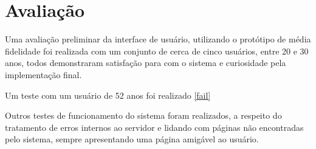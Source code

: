 \section{Avaliação}

Uma avaliação preliminar da interface de usuário, utilizando o protótipo de média fidelidade foi realizada com um conjunto de cerca de cinco usuários, entre 20 e 30 anos, todos demonstraram satisfação para com o sistema e curiosidade pela implementação final.

Um teste com um usuário de 52 anos foi realizado \ref{fail}

Outros testes de funcionamento do sistema foram realizados, a respeito do tratamento de erros internos ao servidor e lidando com páginas não encontradas pelo sistema, sempre apresentando uma página amigável ao usuário.






